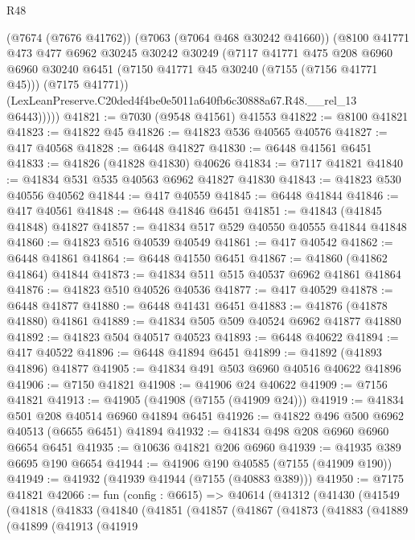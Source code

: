 \begin{lexlean}{R48}
\begin{coremodule}
          (@7674 (@7676 @41762))
          (@7063 (@7064 @468 @30242 @41660))
          (@8100
            @41771
            @473
            @477
            @6962
            @30245
            @30242
            @30249
            (@7117
              @41771
              @475
              @208
              @6960
              @6960
              @30240
              @6451
              (@7150 @41771 @45 @30240 (@7155 (@7156 @41771 @45)))
              (@7175 @41771))
            (LexLeanPreserve.C20ded4f4be0e5011a640fb6c30888a67.R48.__rel_13 @6443)))))
@41821 := @7030 (@9548 @41561) @41553
@41822 := @8100 @41821
@41823 := @41822 @45
@41826 := @41823 @536 @40565 @40576
@41827 := @417 @40568
@41828 := @6448 @41827
@41830 := @6448 @41561 @6451
@41833 := @41826 (@41828 @41830) @40626
@41834 := @7117 @41821
@41840 := @41834 @531 @535 @40563 @6962 @41827 @41830
@41843 := @41823 @530 @40556 @40562
@41844 := @417 @40559
@41845 := @6448 @41844
@41846 := @417 @40561
@41848 := @6448 @41846 @6451
@41851 := @41843 (@41845 @41848) @41827
@41857 := @41834 @517 @529 @40550 @40555 @41844 @41848
@41860 := @41823 @516 @40539 @40549
@41861 := @417 @40542
@41862 := @6448 @41861
@41864 := @6448 @41550 @6451
@41867 := @41860 (@41862 @41864) @41844
@41873 := @41834 @511 @515 @40537 @6962 @41861 @41864
@41876 := @41823 @510 @40526 @40536
@41877 := @417 @40529
@41878 := @6448 @41877
@41880 := @6448 @41431 @6451
@41883 := @41876 (@41878 @41880) @41861
@41889 := @41834 @505 @509 @40524 @6962 @41877 @41880
@41892 := @41823 @504 @40517 @40523
@41893 := @6448 @40622
@41894 := @417 @40522
@41896 := @6448 @41894 @6451
@41899 := @41892 (@41893 @41896) @41877
@41905 := @41834 @491 @503 @6960 @40516 @40622 @41896
@41906 := @7150 @41821
@41908 := @41906 @24 @40622
@41909 := @7156 @41821
@41913 := @41905 (@41908 (@7155 (@41909 @24)))
@41919 := @41834 @501 @208 @40514 @6960 @41894 @6451
@41926 := @41822 @496 @500 @6962 @40513 (@6655 @6451) @41894
@41932 := @41834 @498 @208 @6960 @6960 @6654 @6451
@41935 := @10636 @41821 @206 @6960
@41939 := @41935 @389 @6695 @190 @6654
@41944 := @41906 @190 @40585 (@7155 (@41909 @190))
@41949 := @41932 (@41939 @41944 (@7155 (@40883 @389)))
@41950 := @7175 @41821
@42066 := fun (config : @6615) =>
  @40614
    (@41312
      (@41430
        (@41549
          (@41818
            (@41833
              (@41840
                (@41851
                  (@41857
                    (@41867
                      (@41873
                        (@41883
                          (@41889
                            (@41899
                              (@41913
                                (@41919

\end{coremodule}
\end{lexlean}
